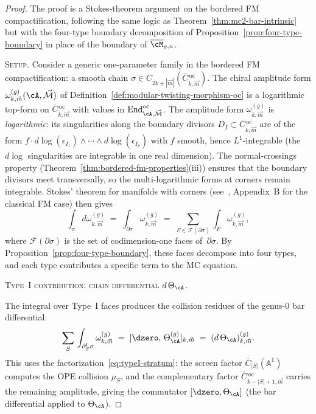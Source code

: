 \begin{proof}
The proof is a Stokes-theorem argument on the bordered FM
compactification, following the same logic as
Theorem~\ref{thm:mc2-bar-intrinsic} but with the four-type
boundary decomposition of
Proposition~\ref{prop:four-type-boundary} in place of the
boundary of $\overline{\cM}_{g,n}$.

\medskip
\noindent\textsc{Setup.}
Consider a generic one-parameter family in the bordered FM
compactification: a smooth chain
$\sigma \in C_{2k + |\vec{m}|}
(\overline{C}{}^{\,\mathrm{oc}}_{k,\vec{m}})$.  The
chiral amplitude form
$\omega^{(g)}_{k,\vec{m}}(\cA, \vec{\mathcal{M}})$ of
Definition~\ref{def:modular-twisting-morphism-oc} is a
logarithmic top-form on
$\overline{C}{}^{\,\mathrm{oc}}_{k,\vec{m}}$ with values in
$\operatorname{End}^{\mathrm{oc}}_{\cA, \vec{\mathcal{M}}}$.
The amplitude form $\omega^{(g)}_{k,\vec{m}}$ is
\emph{logarithmic}: its singularities along the boundary
divisors $D_I \subset
\overline{C}{}^{\,\mathrm{oc}}_{k,\vec{m}}$ are of the form
$f \cdot d\log(\epsilon_{I_1}) \wedge \cdots \wedge
d\log(\epsilon_{I_p})$ with $f$ smooth, hence $L^1$-integrable
(the $d\log$ singularities are integrable in one real dimension).
The normal-crossings property
(Theorem~\ref{thm:bordered-fm-properties}(iii)) ensures that
the boundary divisors meet transversally, so the multi-logarithmic
forms at corners remain integrable.  Stokes' theorem for
manifolds with corners (see~\cite{FM94}, Appendix~B for
the classical FM case) then gives
\begin{equation}\label{eq:stokes-bordered}
\int_\sigma d\omega^{(g)}_{k,\vec{m}}
\;=\;
\int_{\partial\sigma} \omega^{(g)}_{k,\vec{m}}
\;=\;
\sum_{F \in \mathcal{F}(\partial\sigma)}
\int_F \omega^{(g)}_{k,\vec{m}},
\end{equation}
where $\mathcal{F}(\partial\sigma)$ is the set of
codimension-one faces of~$\partial\sigma$.  By
Proposition~\ref{prop:four-type-boundary}, these faces
decompose into four types, and each type contributes a
specific term to the MC equation.

\medskip
\noindent\textsc{Type~I contribution:
chain differential $d\,\Theta_\cA$.}

The integral over Type~I faces produces the collision
residues of the genus-$0$ bar differential:
\[
\sum_{S}\,
\int_{\partial_S^{\mathrm{I}}\sigma}
\omega^{(g)}_{k,\vec{m}}
\;=\;
[\dzero,\, \Theta_\cA^{(g)}]_{k, \vec{m}}
\;=\;
(d\,\Theta_\cA)^{(g)}_{k, \vec{m}}.
\]
This uses the factorization~\eqref{eq:typeI-stratum}: the
screen factor $\overline{C}_{|S|}(\mathbb{A}^1)$ computes the
OPE collision $\mu_S$, and the complementary factor
$\overline{C}{}^{\,\mathrm{oc}}_{k-|S|+1, \vec{m}}$ carries
the remaining amplitude, giving the commutator
$[\dzero, \Theta_\cA]$ (the bar differential applied to
$\Theta_\cA$).


\end{proof}
